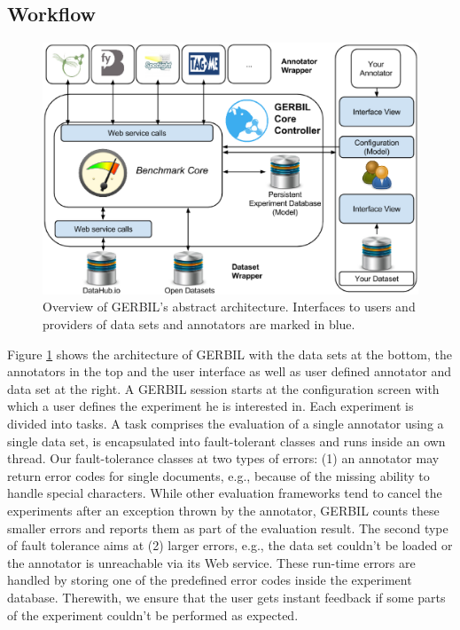 \subsection{Workflow}
\begin{figure}[tb]
    \centering
    \includegraphics[width=0.9\linewidth]{chapter_three/benchmarking/ESWC_2015_DEV_GERBIL/gerbiloverview.eps}
    \caption{Overview of GERBIL's abstract architecture. Interfaces to users and providers of data sets and annotators are marked in blue.}
    \label{cha334:fig:architecture}
\end{figure}
Figure \ref{cha334:fig:architecture} shows the architecture of GERBIL with the data sets at the bottom, the annotators in the top and the user interface as well as user defined annotator and data set at the right.
A GERBIL session starts at the configuration screen with which a user defines the experiment he is interested in.
Each experiment is divided into tasks.
A task comprises the evaluation of a single annotator using a single data set, is encapsulated into fault-tolerant classes and runs inside an own thread.
Our fault-tolerance classes at two types of errors: (1) an annotator may return error codes for single documents, e.g., because of the missing ability to handle special characters.
While other evaluation frameworks tend to cancel the experiments after an exception thrown by the annotator, GERBIL counts these smaller errors and reports them as part of the evaluation result.
The second type of fault tolerance aims at (2) larger errors, e.g., the data set couldn't be loaded or the annotator is unreachable via its Web service.
These run-time errors are handled by storing one of the predefined error codes inside the experiment database.
Therewith, we ensure that the user gets instant feedback if some parts of the experiment couldn't be performed as expected.

